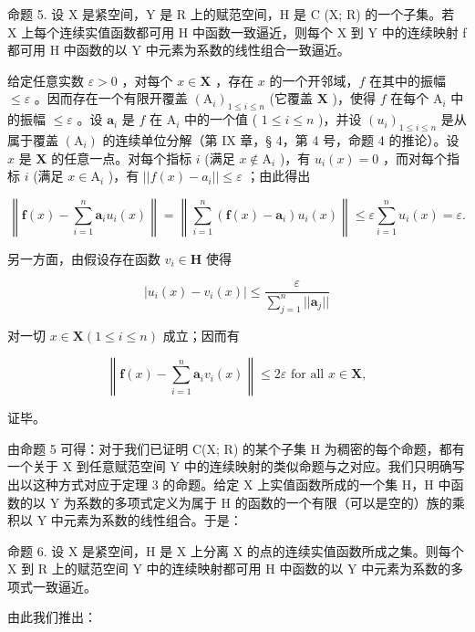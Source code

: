 命题 5. 设 X 是紧空间，Y 是 R 上的赋范空间，H 是 C (X; R) 的一个子集。若 X 上每个连续实值函数都可用 H 中函数一致逼近，则每个 X 到 Y 中的连续映射 f 都可用 H 中函数的以 Y 中元素为系数的线性组合一致逼近。

给定任意实数 \(\varepsilon > 0\) ，对每个 \(x \in \mathbf{X}\) ，存在 \(x\) 的一个开邻域，\(f\) 在其中的振幅 \(\leqslant \varepsilon\) 。因而存在一个有限开覆盖 \((\mathrm{A}_i)_{1 \leqslant i \leqslant n}\) (它覆盖 \(\mathbf{X}\) )，使得 \(f\) 在每个 \(\mathrm{A}_i\) 中的振幅 \(\leqslant \varepsilon\) 。设 \(\boldsymbol{a}_i\) 是 \(f\) 在 \(\mathrm{A}_i\) 中的一个值 ( \(1 \leqslant i \leqslant n\) )，并设 \((u_i)_{1 \leqslant i \leqslant n}\) 是从属于覆盖 \((\mathrm{A}_i)\) 的连续单位分解（第 IX 章，§ 4，第 4 号，命题 4 的推论）。设 \(x\) 是 \(\mathbf{X}\) 的任意一点。对每个指标 \(i\) (满足 \(x \notin \mathrm{A}_i\) )，有 \(u_i(x) = 0\) ，而对每个指标 \(i\) (满足 \(x \in \mathrm{A}_i\) )，有 \(||f(x) - a_i|| \leqslant \varepsilon\) ；由此得出

\[
\left\| \boldsymbol {f} (x) - \sum_ {i = 1} ^ {n} \boldsymbol {a} _ {i} u _ {i} (x) \right\| = \left\| \sum_ {i = 1} ^ {n} (\boldsymbol {f} (x) - \boldsymbol {a} _ {i}) u _ {i} (x) \right\| \leqslant \varepsilon \sum_ {i = 1} ^ {n} u _ {i} (x) = \varepsilon .
\]

另一方面，由假设存在函数 \(v_{i} \in \mathbf{H}\) 使得

\[
\left| u _ {i} (x) - v _ {i} (x) \right| \leqslant \frac {\varepsilon}{\sum_ {j = 1} ^ {n} | | \boldsymbol {a} _ {j} | |}
\]

对一切 \(x \in \mathbf{X} (1 \leqslant i \leqslant n)\) 成立；因而有

\[
\left\| \boldsymbol {f} (x) - \sum_ {i = 1} ^ {n} \boldsymbol {a} _ {i} v _ {i} (x) \right\| \leqslant 2 \varepsilon \text {   for   all   } x \in \mathbf {X},
\]

证毕。

由命题 5 可得：对于我们已证明 C(X; R) 的某个子集 H 为稠密的每个命题，都有一个关于 X 到任意赋范空间 Y 中的连续映射的类似命题与之对应。我们只明确写出以这种方式对应于定理 3 的命题。给定 X 上实值函数所成的一个集 H，H 中函数的以 Y 为系数的多项式定义为属于 H 的函数的一个有限（可以是空的）族的乘积以 Y 中元素为系数的线性组合。于是：

命题 6. 设 X 是紧空间，H 是 X 上分离 X 的点的连续实值函数所成之集。则每个 X 到 R 上的赋范空间 Y 中的连续映射都可用 H 中函数的以 Y 中元素为系数的多项式一致逼近。

由此我们推出：

